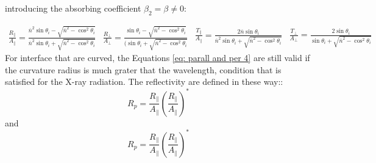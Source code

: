 \begin{flushleft}
introducing the absorbing coefficient $\beta_2 = \beta \neq 0 $:
\end{flushleft}
\begin{subequations}
\begin{equation}
\begin{aligned}
\frac{R_{\parallel}}{A_{\parallel}} = \frac{\overline{n}^2 \sin \theta_i - \sqrt{\overline{n}^2 - \cos^2 \theta_i}}{\overline{n}^2 \sin \theta_i + \sqrt{\overline{n}^2 - \cos^2 \theta_i}} 
\end{aligned}
\label{eq: R/A parll 3}
\end{equation}
\begin{equation}
\begin{aligned}
\frac{R_{\perp}}{A_{\perp}} = \frac{\sin \theta_i - \sqrt{\overline{n}^2 - \cos^2 \theta_i}}{(\sin \theta_i  +  \sqrt{\overline{n}^2 - \cos^2 \theta_i}} 
\end{aligned}
\label{eq: R/A perp 3}
\end{equation}
\begin{equation}
\begin{aligned}
\frac{T_{\parallel}}{A_{\parallel}} = \frac{2\overline{n} \sin \theta_i }{\overline{n}^2 \sin \theta_i  +  \sqrt{\overline{n}^2 - \cos^2 \theta_i}} 
\end{aligned}
\label{eq: T/A parll 3}
\end{equation}
\begin{equation}
\begin{aligned}
\frac{T_{\perp}}{A_{\perp}} = \frac{2 \sin \theta_i }{ \sin \theta_i  +  \sqrt{\overline{n}^2 - \cos^2 \theta_i}} 
\end{aligned}
\label{eq: T/A perp 3}
\end{equation}
\label{eq: parall and per 4}
\end{subequations}
For interface that are curved, the Equations \ref{eq: parall and per 4} are still valid if the curvature radius is much grater that the wavelength, condition that is satisfied for the X-ray radiation.
The reflectivity are defined in these way::
\begin{equation}
R_p =\frac{R_{\parallel}}{A_{\parallel}} \left(\frac{R_{\parallel}}{A_{\parallel}} \right)^{*}
\label{eq: Rp}
\end{equation}
\noindent and
\begin{equation}
R_p =\frac{R_{\parallel}}{A_{\parallel}} \left(\frac{R_{\parallel}}{A_{\parallel}} \right)^{*}
\label{eq: Rs}
\end{equation}
